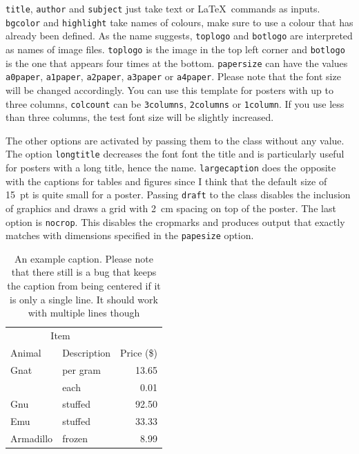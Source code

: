 \documentclass[
]{dtuposter}
\begin{document}
\begin{dtupostercontent}
\texttt{title}, \texttt{author} and \texttt{subject} just take text or
\LaTeX\ commands as inputs. \texttt{bgcolor} and \texttt{highlight} take 
names of colours, make sure to use a colour that has already been defined.
As the name suggests, \texttt{toplogo} and \texttt{botlogo} are interpreted
as names of image files. \texttt{toplogo} is the image in the top left 
corner and \texttt{botlogo} is the one that appears four times at the bottom.
\texttt{papersize} can have the values \texttt{a0paper}, \texttt{a1paper}, 
\texttt{a2paper}, \texttt{a3paper} or \texttt{a4paper}. Please note that the 
font size will be changed accordingly. You can use this template for posters
with up to three columns, \texttt{colcount} can be \texttt{3columns}, 
\texttt{2columns} or \texttt{1column}. If you use less than three columns, 
the test font size will be slightly increased.

The other options are activated by passing them to the class without any value.
The option \texttt{longtitle} decreases the font font the title and is 
particularly useful for posters with a long title, hence the name. 
\texttt{largecaption} does the opposite with the captions for tables and figures 
since I think that the default size of \SI{15}{pt} is quite small for a poster. 
Passing \texttt{draft} to the class disables the inclusion of graphics and draws 
a grid with \SI{2}{\centi\metre} spacing on top of the poster. The last option
is \texttt{nocrop}. This disables the cropmarks and produces output that 
exactly matches with dimensions specified in the \texttt{papesize} option. 

\begin{table}
\caption{An example caption. Please note that there still is a bug that keeps the 
caption from being centered if it is only a single line. It should work with multiple
lines though}\label{tab:example}

\begin{tabular}{llr}
\toprule
\multicolumn{2}{c}{Item} \\
\cmidrule(r){1-2}
Animal    & Description & Price (\$) \\
\midrule
Gnat      & per gram    & 13.65      \\
          & each        & 0.01       \\
Gnu       & stuffed     & 92.50      \\
Emu       & stuffed     & 33.33      \\
Armadillo & frozen      & 8.99       \\
\bottomrule
\end{tabular}
\end{table}


\end{dtupostercontent}
\end{document}
